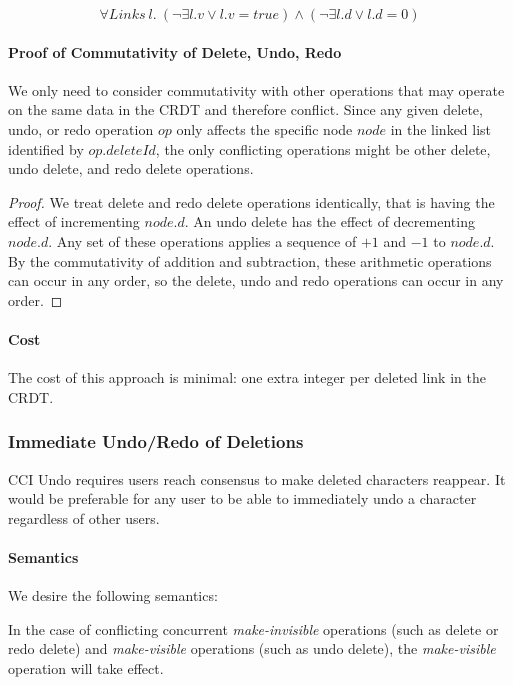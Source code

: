 \documentclass[12pt,a4paper,twoside,openright]{report}
\begin{document}
				\[\forall Links\ l.\  (\lnot\exists l.v \lor l.v = true) \land (\lnot\exists l.d \lor l.d = 0 ) \] 
			
			\paragraph{Proof of Commutativity of Delete, Undo, Redo}
			We only need to consider commutativity with other operations that may operate on the same data in the CRDT and therefore conflict. Since any given delete, undo, or redo operation $op$ only affects the specific node $node$ in the linked list identified by $op.deleteId$, the only conflicting operations might be other delete, undo delete, and redo delete operations.
			
			\begin{proof}
				We treat delete and redo delete operations identically, that is having the effect of incrementing $node.d$. An undo delete has the effect of decrementing $node.d$. Any set of these operations applies a sequence of $+1$ and $-1$ to $node.d$. By the commutativity of addition and subtraction, these arithmetic operations can occur in any order, so the delete, undo and redo operations can occur in any order.
			\end{proof}
			
			\paragraph{Cost}
			The cost of this approach is minimal: one extra integer per deleted link in the CRDT.
			
		\subsubsection{Immediate Undo/Redo of Deletions} \label{sec:immediateundo}
		CCI Undo requires users reach consensus to make deleted characters reappear. It would be preferable for any user to be able to immediately undo a character regardless of other users.
		
			\paragraph{Semantics}
			We desire the following semantics:
			
			In the case of conflicting concurrent \textit{make-invisible} operations (such as delete or redo delete) and \textit{make-visible} operations (such as undo delete), the \textit{make-visible} operation will take effect.
			
\end{document}
